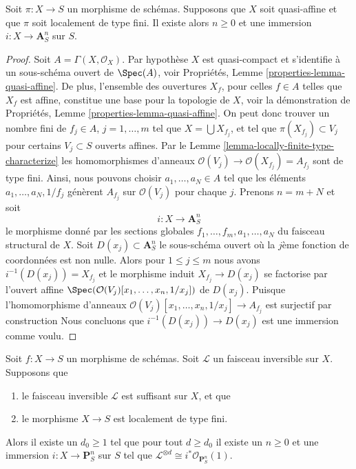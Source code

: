 \begin{lemma}
\label{lemma-quasi-affine-finite-type-over-S}
Soit $\pi : X \to S$ un morphisme de schémas. Supposons
que $X$ soit quasi-affine et que $\pi$ soit localement de
type fini. Il existe alors $n \geq 0$ et une immersion $i : X \to \mathbf{A}^n_S$ sur
$S$.
\end{lemma}

\begin{proof}
Soit $A = \Gamma(X, \mathcal{O}_X)$. Par hypothèse $X$ est quasi-compact
et s'identifie à un sous-schéma ouvert de $\Spec(A)$,
voir Propriétés, Lemme \ref{properties-lemma-quasi-affine}. De plus,
l'ensemble des ouvertures $X_f$, pour celles $f \in A$
telles que $X_f$ est affine, constitue une base
pour la topologie de $X$, voir la démonstration
de Propriétés, Lemme \ref{properties-lemma-quasi-affine}. On peut donc trouver un
nombre fini de $f_j \in A$, $j = 1, \ldots, m$ tel que $X = \bigcup X_{f_j}$,
et tel que $\pi(X_{f_j}) \subset V_j$ pour certains
$V_j \subset S$ ouverts affines. Par le Lemme
\ref{lemma-locally-finite-type-characterize} les homomorphismes d'anneaux $\mathcal{O}(V_j) \to \mathcal{O}(X_{f_j}) = A_{f_j}$ sont
de type fini. Ainsi, nous pouvons choisir $a_1, \ldots, a_N \in A$ tel que
les éléments $a_1, \ldots, a_N, 1/f_j$ génèrent $A_{f_j}$
sur $\mathcal{O}(V_j)$ pour chaque $j$. Prenons $n = m + N$ et
soit
$$
i : X \longrightarrow \mathbf{A}^n_S
$$
le morphisme donné par les sections
globales $f_1, \ldots, f_m, a_1, \ldots, a_N$ du faisceau structural de $X$.
Soit $D(x_j) \subset \mathbf{A}^n_S$ le sous-schéma ouvert où la $j$ème
fonction de coordonnées
est non nulle. Alors pour $1 \leq j \leq m$ nous avons
$i^{-1}(D(x_j)) = X_{f_j}$ et le morphisme induit $X_{f_j} \to D(x_j)$ se factorise
par l'ouvert affine $\Spec(\mathcal{O}(V_j)[x_1, \ldots, x_n, 1/x_j])$ de $D(x_j)$.
Puisque l'homomorphisme
d'anneaux $\mathcal{O}(V_j)[x_1, \ldots, x_n, 1/x_j] \to A_{f_j}$ est surjectif
par construction Nous concluons que $i^{-1}(D(x_j)) \to D(x_j)$ est une
immersion comme voulu.
\end{proof}

\begin{lemma}
\label{lemma-quasi-projective-finite-type-over-S}
Soit $f : X \to S$ un morphisme de schémas. Soit $\mathcal{L}$
un faisceau inversible sur $X$. Supposons
que
\begin{enumerate}
\item le faisceau inversible $\mathcal{L}$ est suffisant sur $X$, et que
\item le morphisme $X \to S$ est localement de type fini.
\end{enumerate}
Alors il existe un $d_0 \geq 1$ tel que pour tout
$d \geq d_0$ il existe un
$n \geq 0$ et une immersion $i : X \to \mathbf{P}^n_S$
sur $S$ tel que $\mathcal{L}^{\otimes d} \cong i^*\mathcal{O}_{\mathbf{P}^n_S}(1)$.
\end{lemma}

